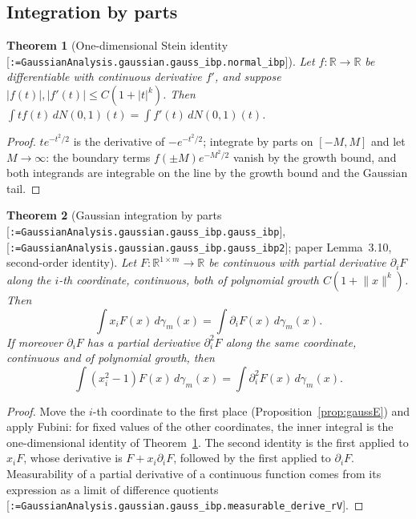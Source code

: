 \documentclass[11pt]{article}
\makeatletter
\newcommand{\formal@break}[1]{\@tfor\formal@tok:=#1\do{%
  \formal@tok
  \expandafter\ifx\formal@tok.\allowbreak\else
  \expandafter\ifx\formal@tok\_\allowbreak\fi\fi}}
\DeclareRobustCommand{\formal}[1]{\textnormal{[\texttt{\small\formal@break{#1}}]}}
\newcommand{\R}{\mathbb{R}}
\newcommand{\norm}[1]{\lVert #1\rVert}
\newcommand{\abs}[1]{\lvert #1\rvert}
\newcommand{\gauss}{\gamma}
\theoremstyle{plain}
\newtheorem{theorem}{Theorem}[section]
\theoremstyle{definition}
\makeatother
\begin{document}
\subsection{Integration by parts}

\begin{theorem}[One-dimensional Stein identity \formal{GaussianAnalysis.gaussian.gauss\_ibp.normal\_ibp}]\label{thm:normal_ibp}
Let $f : \R \to \R$ be differentiable with continuous derivative $f'$, and
suppose $\abs{f(t)}, \abs{f'(t)} \le C(1 + \abs{t}^k)$. Then
$\int t f(t)\, dN(0,1)(t) = \int f'(t)\, dN(0,1)(t)$.
\end{theorem}

\begin{proof}
$t e^{-t^2/2}$ is the derivative of $-e^{-t^2/2}$; integrate by parts on
$[-M, M]$ and let $M \to \infty$: the boundary terms $f(\pm M) e^{-M^2/2}$
vanish by the growth bound, and both integrands are integrable on the line
by the growth bound and the Gaussian tail.
\end{proof}

\begin{theorem}[Gaussian integration by parts \formal{GaussianAnalysis.gaussian.gauss\_ibp.gauss\_ibp}, \formal{GaussianAnalysis.gaussian.gauss\_ibp.gauss\_ibp2}; paper Lemma~3.10, second-order identity]\label{thm:ibp}
Let $F : \R^{1\times m} \to \R$ be continuous with partial derivative
$\partial_i F$ along the $i$-th coordinate, continuous, both of
polynomial growth $C(1 + \norm{x}^k)$. Then
\[
\int x_i F(x)\, d\gauss_m(x) = \int \partial_i F(x)\, d\gauss_m(x) .
\]
If moreover $\partial_i F$ has a partial derivative $\partial_i^2 F$
along the same coordinate, continuous and of polynomial growth, then
\[
\int (x_i^2 - 1) F(x)\, d\gauss_m(x) = \int \partial_i^2 F(x)\, d\gauss_m(x) .
\]
\end{theorem}

\begin{proof}
Move the $i$-th coordinate to the first place (Proposition~\ref{prop:gaussE})
and apply Fubini: for fixed values of the other coordinates, the inner
integral is the one-dimensional identity of Theorem~\ref{thm:normal_ibp}.
The second identity is the first applied to $x_i F$, whose derivative is
$F + x_i \partial_i F$, followed by the first applied to $\partial_i F$.
Measurability of a partial derivative of a continuous function comes from
its expression as a limit of difference quotients
\formal{GaussianAnalysis.gaussian.gauss\_ibp.measurable\_derive\_rV}.
\end{proof}
\end{document}
